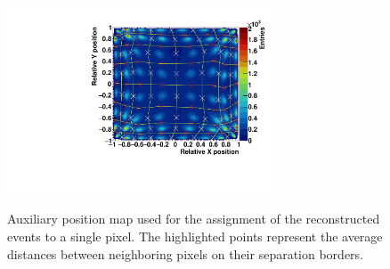 \begin{figure} [!h]
\centering
\includegraphics[width=0.7\textwidth]{03_GraphicFiles/chapter3_CLaRySproto/Absorber/images_charResults_Co60/3_Cal_FLOODMAP_averPoints.pdf}\\
\caption{Auxiliary position map used for the assignment of the reconstructed events to a single pixel. The highlighted points represent the average distances between neighboring pixels on their separation borders.}
\label{chap3::fig::absavPosMap}
\end{figure}

